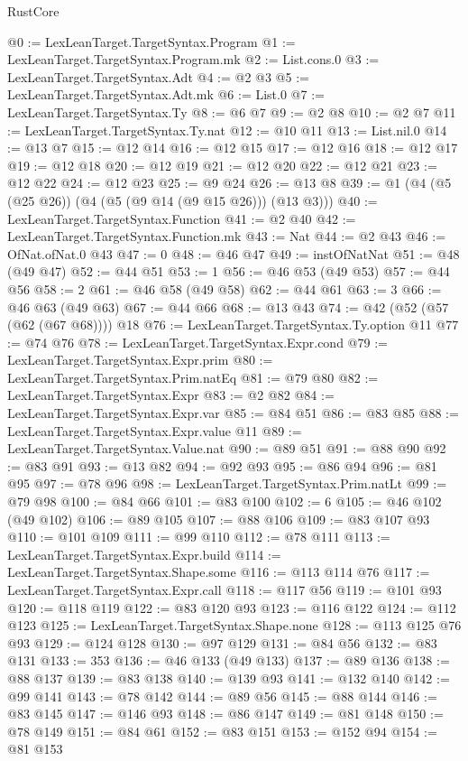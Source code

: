 \begin{lexlean}{RustCore}
\begin{coremodule}
@0 := LexLeanTarget.TargetSyntax.Program
@1 := LexLeanTarget.TargetSyntax.Program.mk
@2 := List.cons.{0}
@3 := LexLeanTarget.TargetSyntax.Adt
@4 := @2 @3
@5 := LexLeanTarget.TargetSyntax.Adt.mk
@6 := List.{0}
@7 := LexLeanTarget.TargetSyntax.Ty
@8 := @6 @7
@9 := @2 @8
@10 := @2 @7
@11 := LexLeanTarget.TargetSyntax.Ty.nat
@12 := @10 @11
@13 := List.nil.{0}
@14 := @13 @7
@15 := @12 @14
@16 := @12 @15
@17 := @12 @16
@18 := @12 @17
@19 := @12 @18
@20 := @12 @19
@21 := @12 @20
@22 := @12 @21
@23 := @12 @22
@24 := @12 @23
@25 := @9 @24
@26 := @13 @8
@39 := @1 (@4 (@5 (@25 @26)) (@4 (@5 (@9 @14 (@9 @15 @26))) (@13 @3)))
@40 := LexLeanTarget.TargetSyntax.Function
@41 := @2 @40
@42 := LexLeanTarget.TargetSyntax.Function.mk
@43 := Nat
@44 := @2 @43
@46 := OfNat.ofNat.{0} @43
@47 := 0
@48 := @46 @47
@49 := instOfNatNat
@51 := @48 (@49 @47)
@52 := @44 @51
@53 := 1
@56 := @46 @53 (@49 @53)
@57 := @44 @56
@58 := 2
@61 := @46 @58 (@49 @58)
@62 := @44 @61
@63 := 3
@66 := @46 @63 (@49 @63)
@67 := @44 @66
@68 := @13 @43
@74 := @42 (@52 (@57 (@62 (@67 @68)))) @18
@76 := LexLeanTarget.TargetSyntax.Ty.option @11
@77 := @74 @76
@78 := LexLeanTarget.TargetSyntax.Expr.cond
@79 := LexLeanTarget.TargetSyntax.Expr.prim
@80 := LexLeanTarget.TargetSyntax.Prim.natEq
@81 := @79 @80
@82 := LexLeanTarget.TargetSyntax.Expr
@83 := @2 @82
@84 := LexLeanTarget.TargetSyntax.Expr.var
@85 := @84 @51
@86 := @83 @85
@88 := LexLeanTarget.TargetSyntax.Expr.value @11
@89 := LexLeanTarget.TargetSyntax.Value.nat
@90 := @89 @51
@91 := @88 @90
@92 := @83 @91
@93 := @13 @82
@94 := @92 @93
@95 := @86 @94
@96 := @81 @95
@97 := @78 @96
@98 := LexLeanTarget.TargetSyntax.Prim.natLt
@99 := @79 @98
@100 := @84 @66
@101 := @83 @100
@102 := 6
@105 := @46 @102 (@49 @102)
@106 := @89 @105
@107 := @88 @106
@109 := @83 @107 @93
@110 := @101 @109
@111 := @99 @110
@112 := @78 @111
@113 := LexLeanTarget.TargetSyntax.Expr.build
@114 := LexLeanTarget.TargetSyntax.Shape.some
@116 := @113 @114 @76
@117 := LexLeanTarget.TargetSyntax.Expr.call
@118 := @117 @56
@119 := @101 @93
@120 := @118 @119
@122 := @83 @120 @93
@123 := @116 @122
@124 := @112 @123
@125 := LexLeanTarget.TargetSyntax.Shape.none
@128 := @113 @125 @76 @93
@129 := @124 @128
@130 := @97 @129
@131 := @84 @56
@132 := @83 @131
@133 := 353
@136 := @46 @133 (@49 @133)
@137 := @89 @136
@138 := @88 @137
@139 := @83 @138
@140 := @139 @93
@141 := @132 @140
@142 := @99 @141
@143 := @78 @142
@144 := @89 @56
@145 := @88 @144
@146 := @83 @145
@147 := @146 @93
@148 := @86 @147
@149 := @81 @148
@150 := @78 @149
@151 := @84 @61
@152 := @83 @151
@153 := @152 @94
@154 := @81 @153

\end{coremodule}
\end{lexlean}
